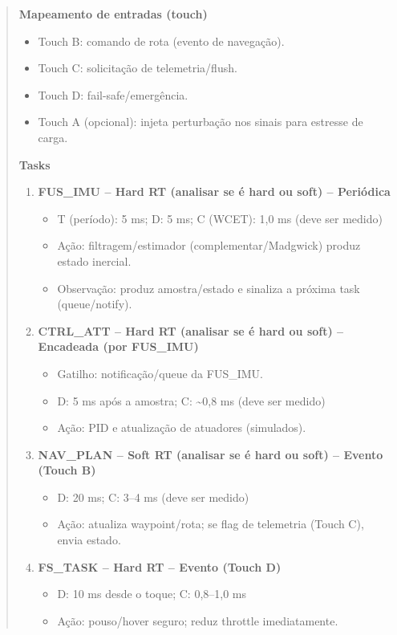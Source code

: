 \begin{quote}
\textbf{Mapeamento de entradas (touch)}
\begin{itemize}
\item Touch B: comando de rota (evento de navegação).
\item Touch C: solicitação de telemetria/flush.
\item Touch D: fail-safe/emergência.
\item Touch A (opcional): injeta perturbação nos sinais para estresse de carga.
\end{itemize}

\textbf{Tasks}
\begin{enumerate}
\item \textbf{FUS\_IMU -- Hard RT (analisar se é hard ou soft) -- Periódica}
\begin{itemize}
\item T (período): 5 ms; D: 5 ms; C (WCET): 1,0 ms (deve ser medido)
\item Ação: filtragem/estimador (complementar/Madgwick) produz estado inercial.
\item Observação: produz amostra/estado e sinaliza a próxima task (queue/notify).
\end{itemize}
\item \textbf{CTRL\_ATT -- Hard RT (analisar se é hard ou soft) -- Encadeada (por FUS\_IMU)}
\begin{itemize}
\item Gatilho: notificação/queue da FUS\_IMU.
\item D: 5 ms após a amostra; C: \textasciitilde0,8 ms (deve ser medido)
\item Ação: PID e atualização de atuadores (simulados).
\end{itemize}
\item \textbf{NAV\_PLAN -- Soft RT (analisar se é hard ou soft) -- Evento (Touch B)}
\begin{itemize}
\item D: 20 ms; C: 3--4 ms (deve ser medido)
\item Ação: atualiza waypoint/rota; se flag de telemetria (Touch C), envia estado.
\end{itemize}
\item \textbf{FS\_TASK -- Hard RT -- Evento (Touch D)}
\begin{itemize}
\item D: 10 ms desde o toque; C: 0,8--1,0 ms
\item Ação: pouso/hover seguro; reduz throttle imediatamente.
\end{itemize}
\end{enumerate}


\end{quote}
